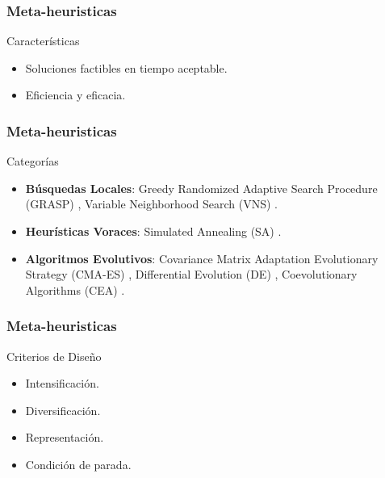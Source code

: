 \begin{frame}

\frametitle{Meta-heuristicas}

\begin{block}{Características}
\begin{itemize}
	\item Soluciones factibles en tiempo aceptable.
	\item Eficiencia y eficacia.
	\end{itemize}
\end{block}

\end{frame}

\begin{frame}
\frametitle{Meta-heuristicas}
\begin{block}{Categorías}
\begin{itemize}
    \item \textbf{Búsquedas Locales}: Greedy Randomized Adaptive Search Procedure (GRASP) \cite{GRASP}, Variable Neighborhood Search (VNS) \cite{vns}.
    \item \textbf{Heurísticas Voraces}: Simulated Annealing (SA) \cite{SA}.
    \item \textbf{Algoritmos Evolutivos}: Covariance Matrix Adaptation Evolutionary Strategy (CMA-ES) \cite{CMA}, Differential Evolution (DE) \cite{DE1, DE2, DE3}, Coevolutionary Algorithms (CEA) \cite{COE1, COE2, COE3}.
\end{itemize}
\end{block}
\end{frame}

\begin{frame}
\frametitle{Meta-heuristicas}
\begin{block}{Criterios de Diseño}
\begin{itemize}
	\item Intensificación.
	\item Diversificación.
	\end{itemize}
\end{block}
\begin{block}{}
\begin{itemize}
	\item Representación.
	\item Condición de parada.
	\end{itemize}
\end{block}
\end{frame}

